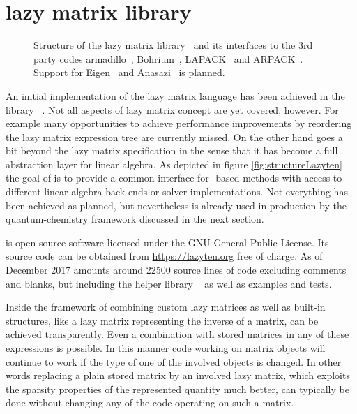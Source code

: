 \section{\lazyten lazy matrix library}
\begin{figure}
	\centering
	\caption[Structure of the \lazyten lazy matrix library]{%
		Structure of the \lazyten lazy matrix library~\cite{lazytenWeb}
		and its interfaces to the 3rd party codes
		armadillo~\cite{Armadillo}, Bohrium~\cite{Kristensen2016array,Kristensen2016streaming},
		LAPACK~\cite{LAPACK} and ARPACK~\cite{ARPACK}.
		Support for Eigen~\cite{Eigen} and Anasazi~\cite{Anasazi} is planned.
	}
	\label{fig:structureLazyten}
\end{figure}
An initial implementation of the lazy matrix language has been
achieved in the \cpp library \lazyten~\cite{lazytenWeb}.
Not all aspects of lazy matrix concept are yet covered, however.
For example many opportunities to achieve performance improvements
by reordering the lazy matrix expression tree are currently missed.
On the other hand \lazyten goes a bit beyond the lazy matrix specification
in the sense that it has become a full abstraction layer for linear algebra.
As depicted in figure \vref{fig:structureLazyten}
the goal of \lazyten is to provide a common interface
for \contraction-based methods
with access to different linear algebra back ends or solver implementations.
Not everything has been achieved as planned,
but nevertheless \lazyten is already used in production
by the \molsturm quantum-chemistry framework discussed in the next section.

\lazyten is open-source software licensed under the
GNU General Public License.
Its source code can be obtained from \url{https://lazyten.org} free of charge.
As of December 2017 \lazyten amounts around 22500 source lines of code
excluding comments and blanks,
but including the helper library \krims~\cite{krimsWeb}
as well as examples and tests.

Inside the framework of \lazyten combining custom lazy matrices
as well as built-in structures,
like a lazy matrix representing the inverse of a matrix,
can be achieved transparently.
Even a combination with stored matrices in any of these expressions is possible.
In this manner code working on \lazyten matrix objects
will continue to work if the type of one of the involved objects is changed.
In other words replacing a plain stored matrix by an involved lazy matrix,
which exploits the sparsity properties of the represented quantity
much better,
can typically be done without changing any of the code operating on such a matrix.

